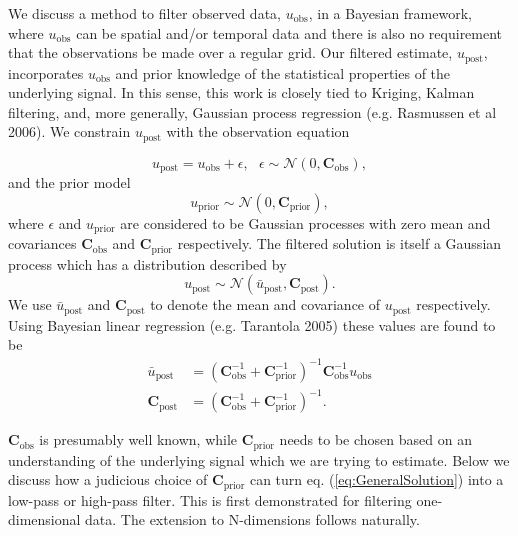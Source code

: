 \documentclass[10pt,a4paper]{article}
\begin{document}
We discuss a method to filter observed data, $u_\mathrm{obs}$, in a Bayesian framework, where $u_\mathrm{obs}$ can be spatial and/or temporal data and there is also no requirement that the observations be made over a regular grid. Our filtered estimate, $u_\mathrm{post}$, incorporates $u_\mathrm{obs}$ and prior knowledge of the statistical properties of the underlying signal.  In this sense, this work is closely tied to Kriging, Kalman filtering, and, more generally, Gaussian process regression (e.g. Rasmussen et al 2006).  We constrain $u_\mathrm{post}$ with the observation equation

\begin{equation}\label{eq:Data}
  u_\mathrm{post} = u_\mathrm{obs} + \epsilon,\ \ \ \epsilon \sim \mathcal{N}(0,\mathbf{C}_\mathrm{obs}),
\end{equation}
and the prior model
\begin{equation}\label{eq:Prior}
  u_\mathrm{prior} \sim \mathcal{N}(0,\mathbf{C}_\mathrm{prior}),
\end{equation}
where $\epsilon$ and $u_\mathrm{prior}$ are considered to be Gaussian processes with zero mean and covariances $\mathbf{C}_\mathrm{obs}$ and $\mathbf{C}_\mathrm{prior}$ respectively.  The filtered solution is itself a Gaussian process which has a distribution described by
\begin{equation}
  u_\mathrm{post} \sim \mathcal{N}(\bar{u}_\mathrm{post},\mathbf{C}_\mathrm{post}).
\end{equation}
We use $\bar{u}_\mathrm{post}$ and $\mathbf{C}_\mathrm{post}$ to denote the mean and covariance of $u_\mathrm{post}$ respectively.  Using Bayesian linear regression (e.g. Tarantola 2005) these values are found to be  
\begin{equation}\label{eq:GeneralSolution}
\begin{split}
  \bar{u}_\mathrm{post} &= (\mathbf{C}_\mathrm{obs}^{-1} + 
                            \mathbf{C}_\mathrm{prior}^{-1})^{-1}
                            \mathbf{C}_\mathrm{obs}^{-1} u_\mathrm{obs}
\\
\mathbf{C}_\mathrm{post} &= (\mathbf{C}_\mathrm{obs}^{-1} + 
                             \mathbf{C}_\mathrm{prior}^{-1})^{-1}.                          
\end{split}
\end{equation}
 
$\mathbf{C}_\mathrm{obs}$ is presumably well known, while $\mathbf{C}_\mathrm{prior}$ needs to be chosen based on an understanding of the underlying signal which we are trying to estimate.  Below we discuss how a judicious choice of $\mathbf{C}_\mathrm{prior}$ can turn eq. (\ref{eq:GeneralSolution}) into a low-pass or high-pass filter.  This is first demonstrated for filtering one-dimensional data.  The extension to N-dimensions follows naturally.  
\end{document}
